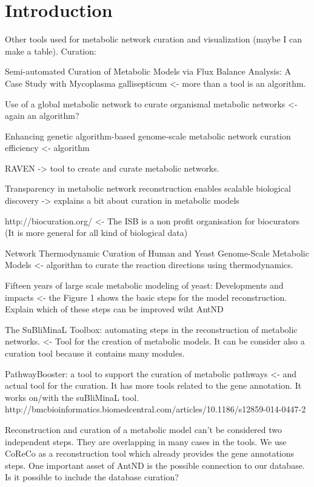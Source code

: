 \section{Introduction}

Other tools used for metabolic network curation and visualization (maybe I can make a table).
Curation: 

Semi-automated Curation of Metabolic Models via Flux Balance Analysis: A Case Study with Mycoplasma gallisepticum <- more than a tool is an algorithm.

Use of a global metabolic network to curate organismal metabolic networks <- again an algorithm?

Enhancing genetic algorithm-based genome-scale metabolic network curation efficiency <- algorithm

RAVEN -> tool to create and curate metabolic networks.

Transparency in metabolic network reconstruction enables scalable biological discovery -> explains a bit about curation in metabolic models

http://biocuration.org/ <- The ISB is a non profit organisation for biocurators (It is more general for all kind of biological data)

Network Thermodynamic Curation of Human and Yeast Genome-Scale Metabolic Models <- algorithm to curate the reaction directions using thermodynamics.

Fifteen years of large scale metabolic modeling of yeast: Developments and impacts <- the Figure 1 shows the basic steps for the model reconstruction. Explain which of these steps can be improved wiht AntND

The SuBliMinaL Toolbox: automating steps in the reconstruction of metabolic networks. <- Tool for the creation of metabolic models. It can be consider also a curation tool because it contains many modules.

PathwayBooster: a tool to support the curation of metabolic pathways <- and actual tool for the curation. It has more tools related to the gene annotation. It works on/with the suBliMinaL tool. http://bmcbioinformatics.biomedcentral.com/articles/10.1186/s12859-014-0447-2

Reconstruction and curation of a metabolic model can't be considered two independent steps. They are overlapping in many cases in the tools. We use CoReCo as a reconstruction tool which already provides the gene annotations steps. 
One important asset of AntND is the possible connection to our database. Is it possible to include the database curation?

